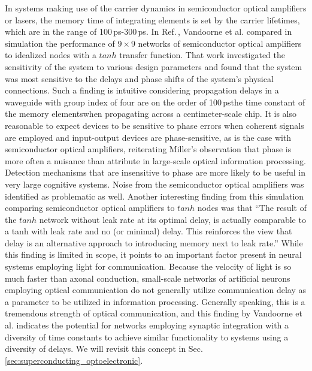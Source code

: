 In systems making use of the carrier dynamics in semiconductor optical amplifiers or lasers, the memory time of integrating elements is set by the carrier lifetimes, which are in the range of 100\,ps-300\,ps. In Ref.\,\cite{vada2011}, Vandoorne et al. compared in simulation the performance of $9\times 9$ networks of semiconductor optical amplifiers to idealized nodes with a $tanh$ transfer function. That work investigated the sensitivity of the system to various design parameters and found that the system was most sensitive to the delays and phase shifts of the system's physical connections. Such a finding is intuitive considering propagation delays in a waveguide with group index of four are on the order of 100\,ps\textemdash the time constant of the memory elements\textemdash when propagating across a centimeter-scale chip. It is also reasonable to expect devices to be sensitive to phase errors when coherent signals are employed and input-output devices are phase-sensitive, as is the case with semiconductor optical amplifiers, reiterating Miller's observation that phase is more often a nuisance than attribute in large-scale optical information processing. Detection mechanisms that are insensitive to phase are more likely to be useful in very large cognitive systems. Noise from the semiconductor optical amplifiers was identified as problematic as well. Another interesting finding from this simulation comparing semiconductor optical amplifiers to $tanh$ nodes was that ``The result of the $tanh$ network without leak rate at its optimal delay, is actually comparable to a tanh with leak rate and no (or minimal) delay. This reinforces the view that delay is an alternative approach to introducing memory next to leak rate.'' While this finding is limited in scope, it points to an important factor present in neural systems employing light for communication. Because the velocity of light is so much faster than axonal conduction, small-scale networks of artificial neurons employing optical communication do not generally utilize communication delay as a parameter to be utilized in information processing. Generally speaking, this is a tremendous strength of optical communication, and this finding by Vandoorne et al. indicates the potential for networks employing synaptic integration with a diversity of time constants to achieve similar functionality to systems using a diversity of delays. We will revisit this concept in Sec.\,\ref{sec:superconducting_optoelectronic}.

